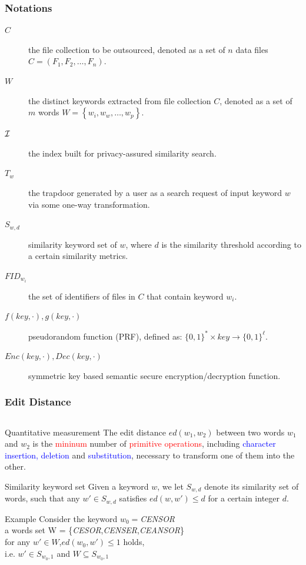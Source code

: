 \documentclass{beamer}
\begin{document}
\begin{frame}
	\frametitle{Notations}
	\begin{description}
		\item[$C$]the file collection to be outsourced, denoted as a set of $n$ data files $C = ({F_1},{F_2}, \ldots ,{F_n})$.
		\item[$W$]the distinct keywords extracted from file collection $C$, denoted as a set of $m$ words $W = \left\{ {{w_i},{w_w}, \ldots ,{w_p}} \right\}$.
		\item[$\cal I$]the index built for privacy-assured similarity search.
		\item[${T_w}$] the trapdoor generated by a user as a search request of input keyword $w$ via some one-way transformation.
		\item[${S_{w,d}}$] similarity keyword set of $w$, where $d$ is the similarity threshold according to a certain similarity metrics.
		\item[$FI{D_{{w_i}}}$]the set of identifiers of files in $C$ that contain keyword ${{w_i}}$.
		\item[$f(key, \cdot ),g(key, \cdot )$]pseudorandom function (PRF), defined	as: ${\{ 0,1\} ^*} \times key \to {\{ 0,1\} ^{\ell }}$.
		\item[$Enc(key, \cdot ),Dec(key, \cdot )$]symmetric key based semantic secure encryption/decryption function.
	\end{description}
\end{frame}

\begin{frame}
	\frametitle{Edit Distance}
	\begin{columns}
	\end{columns}
	\begin{block}{Quantitative measurement}
		The edit distance $ed({w_1},{w_2})$ between two words ${w_1}$ and ${w_2}$ is the \textcolor{red}{mininum} number of \textcolor{red}{primitive operations}, including \textcolor{blue}{character insertion, deletion} and \textcolor{blue}{substitution}, necessary to transform one of them into the other.
	\end{block}
	
	\begin{block}{Similarity keyword set}
		Given a keyword $w$, we let ${S_{w,d}}$ denote its similarity set of words, such that any $w' \in {S_{w,d}}$ satisfies \textcolor[rgb]{0.1,0.6,0.3}{$ed(w,w') \le d$}  for a certain integer $d$.
	\end{block}
	
	\begin{exampleblock}{Example}
		Consider the keyword $w_0=$\textit{CENSOR}\\
		a words set W = \{\textit{CESOR},\textit{CENSER},\textit{CEANSOR}\}\\
		for any $w' \in W$,$ed({w_0},w') \le 1$ holds,\\
		i.e. $w' \in {S_{{w_0},1}}$ and $W \subseteq {S_{{w_0},1}}$
	\end{exampleblock}
\end{frame}
\end{document}
